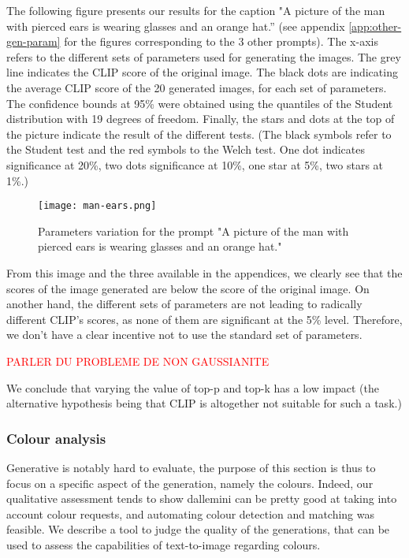 \documentclass{article}
\begin{document}
\begin{multicols}{2}
The following figure presents our results for the caption "A
picture of the man with pierced ears is wearing
glasses and an orange hat.” (see appendix  \ref{app:other-gen-param} for the figures corresponding to the 3 other prompts). The x-axis refers to the different sets of parameters used for generating the images. The grey line indicates the CLIP score of the original image. The black dots are indicating the average CLIP score of the 20 generated images, for each set of parameters. The confidence bounds at 95\% were obtained using the quantiles of the Student distribution with 19 degrees of freedom. 
Finally, the stars and dots at the top of the picture indicate the result of the different tests. (The black symbols refer to the Student test and the red symbols to the Welch test. One dot indicates significance at 20\%, two dots significance at 10\%, one star at 5\%, two stars at 1\%.)

\begin{figure}[H]
    \centering
    \texttt{[image: man-ears.png]} %
    \caption{Parameters variation for the prompt "A picture of the man with pierced ears is wearing glasses and an orange hat."}
    \label{fig:gen-man-ears}
\end{figure}

From this image and the three available in the appendices, we clearly see that the scores of the image generated are below the score of the original image. On another hand, the different sets of parameters are not leading to radically different CLIP's scores, as none of them are significant at the 5\% level. Therefore, we don't have a clear incentive not to use the standard set of parameters.  

\textcolor{red}{PARLER DU PROBLEME DE NON GAUSSIANITE}

We conclude that varying the value of top-p and top-k has a low impact (the alternative hypothesis being that CLIP is altogether not suitable for such a task.)

\subsubsection{Colour analysis}

Generative is notably hard to evaluate, the purpose of this section is thus to focus on a specific aspect of the generation, namely the colours.
Indeed, our qualitative assessment tends to show \gls{dallemini} can be pretty good at taking into account colour requests, and automating colour detection and matching was feasible.
We describe a tool to judge the quality of the generations, that can be used to assess the capabilities of text-to-image regarding colours.


\end{multicols}
\end{document}
